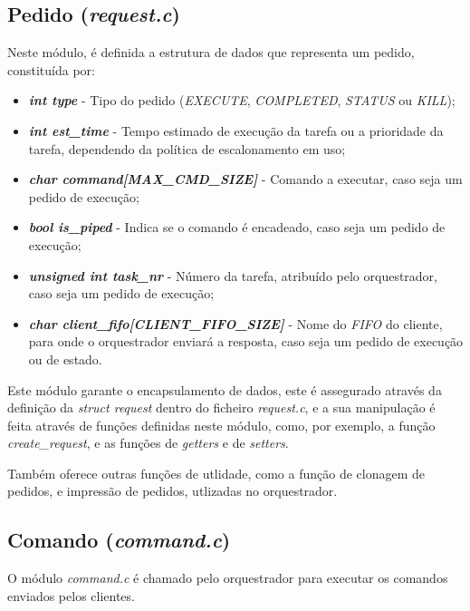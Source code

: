 \documentclass[a4paper,11pt]{scrreprt}
\begin{document}
        \subsection{Pedido (\textit{request.c})}
            Neste módulo, é definida a estrutura de dados que representa um pedido, constituída por:
            \begin{itemize}
                \item \textbf{\textit{int type}} - Tipo do pedido
                    (\textit{EXECUTE}, \textit{COMPLETED}, \textit{STATUS} ou \textit{KILL});
                \item \textbf{\textit{int est\_time}} - Tempo estimado de execução da tarefa
                    ou a prioridade da tarefa, dependendo da política de escalonamento em uso;
                \item \textbf{\textit{char command[MAX\_CMD\_SIZE]}} - Comando a executar, caso seja um pedido de execução;
                \item \textbf{\textit{bool is\_piped}} - Indica se o comando é encadeado, caso seja um pedido de execução;
                \item \textbf{\textit{unsigned int task\_nr}} - Número da tarefa, atribuído pelo orquestrador, caso seja um pedido de execução;
                \item \textbf{\textit{char client\_fifo[CLIENT\_FIFO\_SIZE]}} - Nome do \textit{FIFO} do cliente,
                    para onde o orquestrador enviará a resposta, caso seja um pedido de execução ou de estado.
            \end{itemize}

            Este módulo garante o encapsulamento de dados, este é assegurado através da definição da
            \textit{struct request} dentro do ficheiro \textit{request.c}, e a sua manipulação é feita através
            de funções definidas neste módulo, como, por exemplo, a função \textit{create\_request}, e as funções
            de \textit{getters} e de \textit{setters}.

            Também oferece outras funções de utlidade, como a função de clonagem de pedidos, e impressão de pedidos,
            utlizadas no orquestrador.

        \subsection{Comando (\textit{command.c})}
            O módulo \textit{command.c} é chamado pelo orquestrador para executar os comandos enviados pelos clientes.
\end{document}
